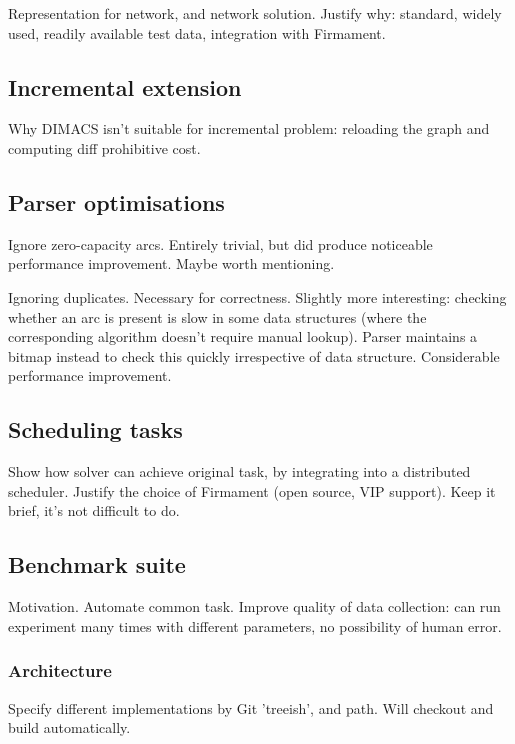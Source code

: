 Representation for network, and network solution. Justify why: standard, widely used, readily available test data, integration with Firmament. 

\subsection{Incremental extension}

Why DIMACS isn't suitable for incremental problem: reloading the graph and computing diff prohibitive cost. 

\subsection{Parser optimisations}

Ignore zero-capacity arcs. Entirely trivial, but did produce noticeable performance improvement. Maybe worth mentioning.

Ignoring duplicates. Necessary for correctness. Slightly more interesting: checking whether an arc is present is slow in some data structures (where the corresponding algorithm doesn't require manual lookup). Parser maintains a bitmap instead to check this quickly irrespective of data structure. Considerable performance improvement. 

\subsection{Scheduling tasks}

Show how solver can achieve original task, by integrating into a distributed scheduler. Justify the choice of Firmament (open source, VIP support). Keep it brief, it's not difficult to do.

\subsection{Benchmark suite} \label{sec:impl-benchmark}

Motivation. Automate common task. Improve quality of data collection: can run experiment many times with different parameters, no possibility of human error. 

\subsubsection{Architecture}

Specify different implementations by Git 'treeish', and path. Will checkout and build automatically. 


